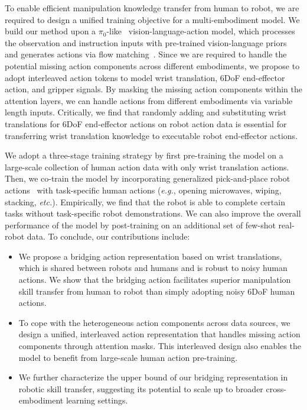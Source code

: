 \documentclass{llmxive}
\begin{document}
To enable efficient manipulation knowledge transfer from human to robot, we are required to design a unified training objective for a multi-embodiment model.
% 
We build our method upon a $\pi_0$-like~\cite{black2024pi_0} vision-language-action model, which processes the observation and instruction inputs with pre-trained vision-language priors and generates actions via flow matching~\cite{liu2022flow,lipman2022flow}.
% 
Since we are required to handle the potential missing action components across different embodiments, we propose to adopt interleaved action tokens to model wrist translation, 6DoF end-effector action, and gripper signals.
% 
By masking the missing action components within the attention layers, we can handle actions from different embodiments via variable length inputs.
% 
Critically, we find that randomly adding and substituting wrist translations for 6DoF end-effector actions on robot action data is essential for transferring wrist translation knowledge to executable robot end-effector actions.



We adopt a three-stage training strategy by first pre-training the model on a large-scale collection of human action data with only wrist translation actions.
% 
Then, we co-train the model by incorporating generalized pick-and-place robot actions~\cite{cheang2025gr3} with task-specific human actions (\textit{e.g.}, opening microwaves, wiping, stacking, \textit{etc.}).
% 
Empirically, we find that the robot is able to complete certain tasks without task-specific robot demonstrations.
% 
We can also improve the overall performance of the model by post-training on an additional set of few-shot real-robot data.
% 
To conclude, our contributions include:

\begin{itemize}
    \item We propose a bridging action representation based on wrist translations, which is shared between robots and humans and is robust to noisy human actions.
    We show that the bridging action facilitates superior manipulation skill transfer from human to robot than simply adopting noisy 6DoF human actions.

    \item To cope with the heterogeneous action components across data sources, we design a unified, interleaved action representation that handles missing action components through attention masks.
    This interleaved design also enables the model to benefit from large-scale human action pre-training.

    \item We further characterize the upper bound of our bridging representation in robotic skill transfer, suggesting its potential to scale up to broader cross-embodiment learning settings.
\end{itemize}
\end{document}
